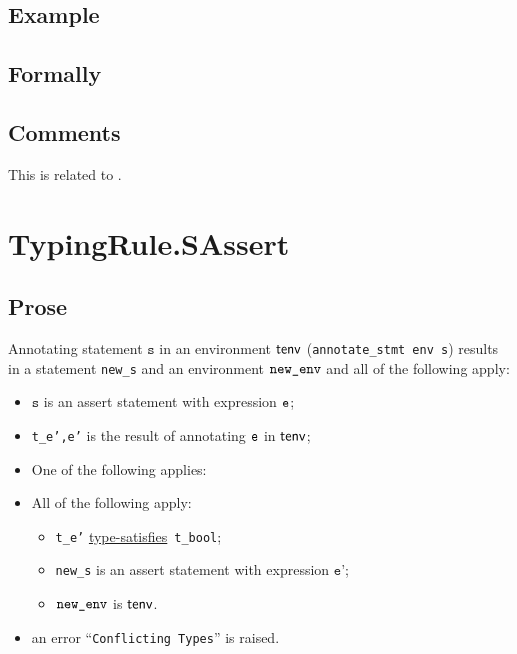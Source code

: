 \documentclass{book}
\newcommand\typesatisfies[0]{\hyperlink{def-typesatisfies}{type-satisfies}}
\newcommand\vs[0]{\texttt{s}}
\newcommand\vep[0]{\texttt{e'}}
\begin{document}
  \subsection{Example}



\begin{emptyformal}
    \subsection{Formally}
\end{emptyformal}

\subsection{Comments}
    This is related to .

\section{TypingRule.SAssert \label{sec:TypingRule.SAssert}}

  \subsection{Prose}
Annotating statement $\vs$ in an environment $\textsf{tenv}$
(\texttt{annotate\_stmt env s}) results in a statement \texttt{new\_s} and an
environment $\texttt{new\_env}$ and all of the following apply:
   \begin{itemize}
   \item $\vs$ is an assert statement with expression $\texttt{e}$;
   \item \texttt{t\_e',e'} is the result of annotating $\texttt{e}$ in $\textsf{tenv}$;
   \item One of the following applies:
     \item All of the following apply:
       \begin{itemize}
       \item \texttt{t\_e'} \typesatisfies\  \texttt{t\_bool};
       \item \texttt{new\_s} is an assert statement with expression $\vep$;
       \item $\texttt{new\_env}$ is $\textsf{tenv}$.
       \end{itemize}
     \item an error ``\texttt{Conflicting Types}'' is raised.
   \end{itemize}
\end{document}
